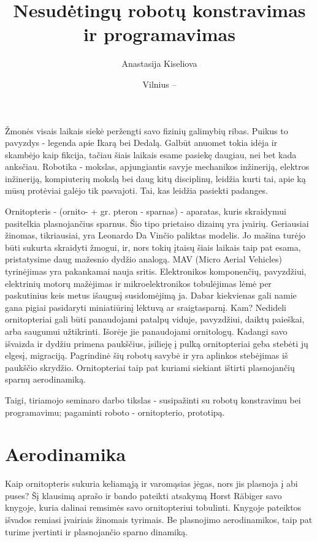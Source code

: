 \documentclass{VUMIFPSkursinis}
\title{Nesudėtingų robotų konstravimas ir programavimas}
\author{Anastasija Kiseliova}
\date{Vilnius – \the\year}
\begin{document}
\maketitle
\tableofcontents

Žmonės visais laikais siekė peržengti savo fizinių galimybių ribas. Puikus to pavyzdys - legenda apie Ikarą bei Dedalą. Galbūt anuomet tokia idėja ir skambėjo kaip fikcija, tačiau šiais laikais esame pasiekę daugiau, nei bet kada anksčiau. Robotika - mokslas, apjungiantis savyje mechanikos inžineriją, elektros inžineriją, kompiuterių mokslą bei daug kitų disciplinų, leidžia kurti tai, apie ką mūsų protėviai galėjo tik pasvajoti. Tai, kas leidžia pasiekti padanges.\par
Ornitopteris - (ornito- + gr. pteron - sparnas) - aparatas, kuris skraidymui pasitelkia plasnojančius sparnus. Šio tipo prietaiso dizainų yra įvairių. Geriausiai žinomas, tikriausiai, yra Leonardo Da Vinčio paliktas modelis. Jo mašina turėjo būti sukurta skraidyti žmogui, ir, nors tokių įtaisų šiais laikais taip pat esama, pristatysime daug mažesnio dydžio analogą. MAV (Micro Aerial Vehicles) tyrinėjimas yra pakankamai nauja sritis. Elektronikos komponenčių, pavyzdžiui, elektrinių motorų mažėjimas ir mikroelektronikos tobulėjimas lėmė per paskutinius keis metus išaugusį susidomėjimą ja. Dabar kiekvienas gali namie gana pigiai pasidaryti miniatiūrinį lėktuvą ar sraigtasparnį. Kam? Nedideli ornitopteriai gali būti panaudojami patalpų viduje, pavyzdžiui, daiktų paieškai, arba saugumui užtikrinti. Išorėje jie panaudojami ornitologų. Kadangi savo išvaizda ir dydžiu primena paukščius, įsilieję į pulką ornitopteriai geba stebėti jų elgesį, migraciją. Pagrindinė šių robotų savybė ir yra aplinkos stebėjimas iš paukščio skrydžio. Ornitopteriai taip pat kuriami siekiant ištirti plasnojančių sparnų aerodinamiką. \par
Taigi, tiriamojo seminaro darbo tikslas - susipažinti su robotų konstravimu bei programavimu; pagaminti roboto - ornitopterio, prototipą. 

\section{Aerodinamika}
Kaip ornitopteris sukuria keliamąją ir varomąsias jėgas, nors jis plasnoja į abi puses? Šį klausimą aprašo ir bando pateikti atsakymą Horst Räbiger savo knygoje, kuria dalinai remsimės savo ornitopteriui tobulinti. Knygoje pateiktos išvados remiasi įvairiais žinomais tyrimais. Be plasnojimo aerodinamikos, taip pat turime įvertinti ir plasnojančio sparno dinamiką.
\end{document}
